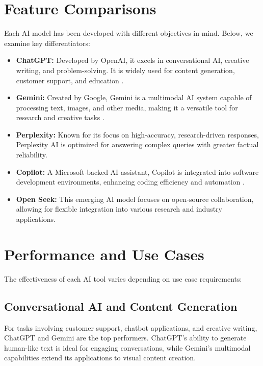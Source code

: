 \documentclass[a4paper,headinclude=on,footinclude=on,12pt,oneside]{scrbook}
\begin{document}
\section{Feature Comparisons}

Each AI model has been developed with different objectives in mind. Below, we examine key differentiators:

\begin{itemize}
	\item \textbf{ChatGPT:} Developed by OpenAI, it excels in conversational AI, creative writing, and problem-solving. It is widely used for content generation, customer support, and education \cite{ChatGPTCopilotVisual}.
	\item \textbf{Gemini:} Created by Google, Gemini is a multimodal AI system capable of processing text, images, and other media, making it a versatile tool for research and creative tasks \cite{chriscarmichaelLibraryGuidesGuideArtificial}.
	\item \textbf{Perplexity:} Known for its focus on high-accuracy, research-driven responses, Perplexity AI is optimized for answering complex queries with greater factual reliability.
	\item \textbf{Copilot:} A Microsoft-backed AI assistant, Copilot is integrated into software development environments, enhancing coding efficiency and automation \cite{MicrosoftCopilotAI}.
	\item \textbf{Open Seek:} This emerging AI model focuses on open-source collaboration, allowing for flexible integration into various research and industry applications.
\end{itemize}

\section{Performance and Use Cases}

The effectiveness of each AI tool varies depending on use case requirements:

\subsection{Conversational AI and Content Generation}

For tasks involving customer support, chatbot applications, and creative writing, ChatGPT and Gemini are the top performers. ChatGPT's ability to generate human-like text is ideal for engaging conversations, while Gemini's multimodal capabilities extend its applications to visual content creation.
\end{document}
